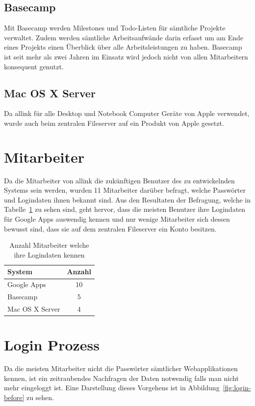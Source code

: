\subsection{Basecamp}
\label{subs:Basecamp}
Mit Basecamp werden Milestones und Todo-Listen für sämtliche Projekte verwaltet. Zudem werden sämtliche Arbeitsaufwände darin erfasst um am Ende eines Projekts einen Überblick über alle Arbeitsleistungen zu haben. Basecamp ist seit mehr als zwei Jahren im Einsatz wird jedoch nicht von allen Mitarbeitern konsequent genutzt.

\subsection{Mac OS X Server}
\label{subs:Mac OS X Server}
Da allink für alle Desktop und Notebook Computer Geräte von Apple verwendet, wurde auch beim zentralen Fileserver auf ein Produkt von Apple gesetzt.

\section{Mitarbeiter}
\label{sec:Mitarbeiter}
Da die Mitarbeiter von allink die zukünftigen Benutzer des zu entwickelnden Systems sein werden, wurden 11 Mitarbeiter darüber befragt, welche Passwörter und Logindaten ihnen bekannt sind. Aus den Resultaten der Befragung, welche in Tabelle~\ref{tab:umfrage_passworter} zu sehen sind, geht hervor, dass die meisten Benutzer ihre Logindaten für Google Apps auswendig kennen und nur wenige Mitarbeiter sich dessen bewusst sind, dass sie auf dem zentralen Fileserver ein Konto besitzen.

\begin{table}
  \centering
  \begin{tabular}
  	{|l | c|} \hline System & Anzahl\\
  	\hline Google Apps & 10\\
  	\hline Basecamp & 5\\
  	\hline Mac OS X Server & 4\\
  	\hline 
  \end{tabular}
  \caption{Anzahl Mitarbeiter welche ihre Logindaten kennen}
  \label{tab:umfrage_passworter}
\end{table}

\section{Login Prozess}
\label{sec:Login Prozess}
Da die meisten Mitarbeiter nicht die Passwörter sämtlicher Webapplikationen kennen, ist ein zeitraubendes Nachfragen der Daten notwendig falls man nicht mehr eingeloggt ist. Eine Darstellung dieses Vorgehens ist in Abbildung~\ref{fig:login-before} zu sehen.

